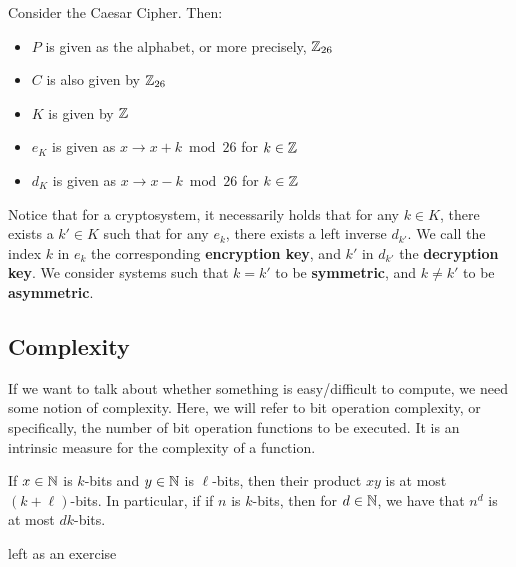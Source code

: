 \documentclass{article}
\begin{document}
\begin{xmp}[source=Primary Source Material]
Consider the Caesar Cipher. Then:
\begin{itemize}
    \item $ P $ is given as the alphabet, or more precisely, $ \mathbb{Z}_{26} $
    \item $ C $ is also given by $ \mathbb{Z}_{26} $
    \item $ K $ is given by $ \mathbb{Z} $
    \item $ e_{K} $ is given as $ x \rightarrow x + k \bmod 26 $ for $ k \in \mathbb{Z} $
    \item $ d_{K} $ is given as $ x \rightarrow x - k \bmod 26 $ for $ k \in \mathbb{Z} $
\end{itemize}
\end{xmp}

\newpage

\begin{defn}
Notice that for a cryptosystem, it necessarily holds that for any $ k \in K $, there exists a $ k' \in K $ such that for any $ e_{k} $, there exists a left inverse $ d_{k'} $. \vsp
We call the index $ k $ in $ e_{k} $ the corresponding \textbf{encryption key}, and $ k' $ in $ d_{k'} $ the \textbf{decryption key}. \vsp
We consider systems such that $ k = k' $ to be \textbf{symmetric}, and $ k \neq k' $ to be \textbf{asymmetric}.
\end{defn}

\subsection{Complexity}


If we want to talk about whether something is easy/difficult to compute, we need some notion of complexity.
Here, we will refer to bit operation complexity, or specifically,
the number of bit operation functions to be executed.
It is an intrinsic measure for the complexity of a function.

\begin{thm}
If $ x \in \mathbb{N} $ is $ k $-bits and $ y \in \mathbb{N} $ is $ \ell $-bits, then
their product $ xy $ is at most $ (k + \ell) $-bits. \vsp
In particular, if if $ n $ is $ k $-bits, then for $ d \in \mathbb{N} $,
we have that $ n^{d} $ is at most $ dk $-bits.
\end{thm}

\begin{pf}
left as an exercise
\end{pf}
\end{document}
